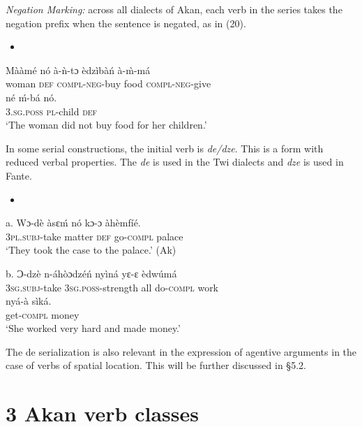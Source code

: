 \documentclass[output=paper]{langsci/langscibook}
\begin{document}
\begin{styleListei}
\emph{Negation Marking:} across all dialects of Akan, each verb in the series takes the negation prefix when the sentence is negated, as in (20). 
\end{styleListei}

\begin{itemize}
\item \end{itemize}
\gll M\`{a}\`{a}m\'{e}  n\'{o}  \`{a}-\`{n}-tɔ      \`{e}dz\`{i}b\`{a}\'{n}  \`{a}-\`{m}-m\'{a}  \\
     woman  \textsc{def}  \textsc{compl}{}-\textsc{neg}{}-buy  food    \textsc{compl}{}-\textsc{neg}{}-give\\
\gll n\'{e}    \'{m}-b\'{a}    n\'{o}.\\
     \textsc{3.sg.poss}  \textsc{pl}{}-child  \textsc{def}\\
\glt ‘The woman did not buy food for her children.’
\z

In some serial constructions, the initial verb is \emph{de/dze}. This is a form with reduced verbal properties. The \emph{de }is used in the Twi dialects and \emph{dze} is used in Fante. 

\begin{itemize}
\item \end{itemize}
\gll a.  Wɔ-d\`{e}    \`{a}sɛ\'{m}  n\'{o}  kɔ-ɔ    \`{a}h\`{e}mf\'{i}\'{e}.\\
       \textsc{3pl.subj}{}-take  matter  \textsc{def}  go-\textsc{compl}  palace\\
\glt   ‘They took the case to the palace.’ (Ak)
\z

\gll  b.  Ɔ{}-dz\`{e}    n-\'{a}h\`{o}ɔdz\'{e}\'{n}    ny\`{i}n\'{a}  yɛ-ɛ     \`{e}dw\'{u}m\'{a} \\
       \textsc{3sg.subj}{}-take  \textsc{3sg.poss}{}-strength  all  do-\textsc{compl}  work\\
\gll   ny\'{a}-\`{a}    s\`{i}k\'{a}.\\
       get-\textsc{compl}  money\\
\glt   ‘She worked very hard and made money.’
\z

The de serialization is also relevant in the expression of agentive arguments in the case of verbs of spatial location. This will be further discussed in §5.2.

\chapter[3  Akan verb classes]{3  Akan verb classes}
\end{document}
